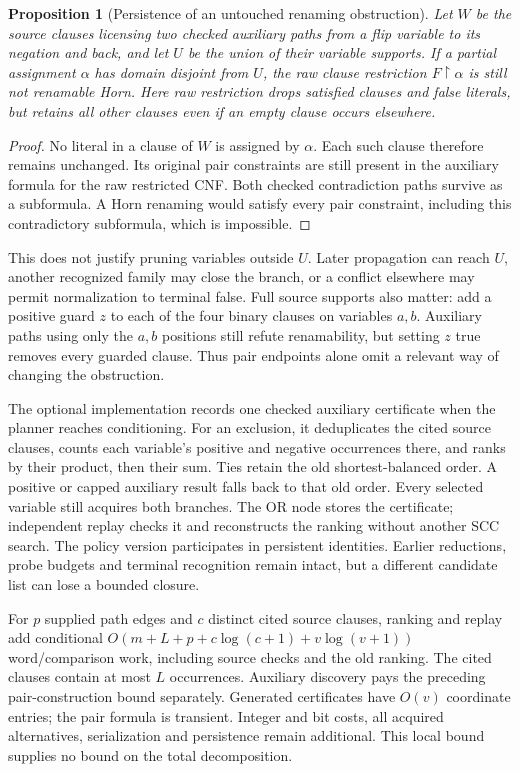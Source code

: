 \documentclass[11pt,a4paper]{article}
\numberwithin{equation}{section}
\theoremstyle{plain}
\newtheorem{proposition}[lemma]{Proposition}
\theoremstyle{definition}
\theoremstyle{remark}
\begin{document}
\begin{proposition}[Persistence of an untouched renaming obstruction]
\label{prop:untouched-renaming-obstruction}
Let $W$ be the source clauses licensing two checked auxiliary paths from a flip variable to its negation and back, and let $U$ be the union of their variable supports. If a partial assignment $\alpha$ has domain disjoint from $U$, the raw clause restriction $F\upharpoonright\alpha$ is still not renamable Horn. Here raw restriction drops satisfied clauses and false literals, but retains all other clauses even if an empty clause occurs elsewhere.
\end{proposition}
\begin{proof}
No literal in a clause of $W$ is assigned by $\alpha$. Each such clause therefore remains unchanged. Its original pair constraints are still present in the auxiliary formula for the raw restricted CNF. Both checked contradiction paths survive as a subformula. A Horn renaming would satisfy every pair constraint, including this contradictory subformula, which is impossible.
\end{proof}

This does not justify pruning variables outside $U$. Later propagation can reach $U$, another recognized family may close the branch, or a conflict elsewhere may permit normalization to terminal false. Full source supports also matter: add a positive guard $z$ to each of the four binary clauses on variables $a,b$. Auxiliary paths using only the $a,b$ positions still refute renamability, but setting $z$ true removes every guarded clause. Thus pair endpoints alone omit a relevant way of changing the obstruction.

The optional implementation records one checked auxiliary certificate when the planner reaches conditioning. For an exclusion, it deduplicates the cited source clauses, counts each variable's positive and negative occurrences there, and ranks by their product, then their sum. Ties retain the old shortest-balanced order. A positive or capped auxiliary result falls back to that old order. Every selected variable still acquires both branches. The OR node stores the certificate; independent replay checks it and reconstructs the ranking without another SCC search. The policy version participates in persistent identities. Earlier reductions, probe budgets and terminal recognition remain intact, but a different candidate list can lose a bounded closure.

For $p$ supplied path edges and $c$ distinct cited source clauses, ranking and replay add conditional $O(m+L+p+c\log(c+1)+v\log(v+1))$ word/comparison work, including source checks and the old ranking. The cited clauses contain at most $L$ occurrences. Auxiliary discovery pays the preceding pair-construction bound separately. Generated certificates have $O(v)$ coordinate entries; the pair formula is transient. Integer and bit costs, all acquired alternatives, serialization and persistence remain additional. This local bound supplies no bound on the total decomposition.
\end{document}
